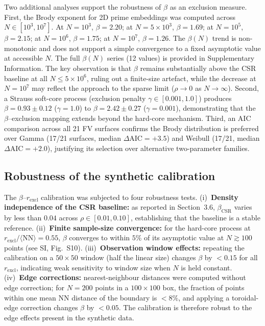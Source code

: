 \documentclass[final,3p,times,twocolumn]{elsarticle}
\theoremstyle{definition}
\begin{document}
Two additional analyses support the robustness of $\beta$
as an exclusion measure. First, the Brody exponent for 2D prime
embeddings was computed across $N \in [10^3, 10^7]$. At
$N=10^3$, $\beta=2.20$; at $N=5\times10^3$, $\beta=1.69$;
at $N=10^5$, $\beta=2.15$; at $N=10^6$, $\beta=1.75$;
at $N=10^7$, $\beta=1.26$. The $\beta(N)$ trend is
non-monotonic and does not support a simple convergence to a
fixed asymptotic value at accessible $N$. The full $\beta(N)$
series (12 values) is provided in Supplementary Information.
The key observation is that $\beta$ remains substantially above
the CSR baseline at all $N \leq 5\times10^6$, ruling out a
finite-size artefact, while the decrease at $N=10^7$ may
reflect the approach to the sparse limit ($\rho \to 0$ as
$N\to\infty$). Second, a Strauss soft-core
process (exclusion penalty $\gamma \in [0.001, 1.0]$)
produces $\beta = 0.93 \pm 0.12$ ($\gamma=1.0$) to
$\beta = 2.42 \pm 0.27$ ($\gamma=0.001$), demonstrating that
the $\beta$--exclusion mapping extends beyond the hard-core
mechanism. Third, an AIC
comparison across all 21 FV surfaces confirms the Brody
distribution is preferred over Gamma (17/21 surfaces,
median $\Delta\text{AIC} = +3.5$) and Weibull (17/21,
median $\Delta\text{AIC} = +2.0$), justifying its selection
over alternative two-parameter families.

\subsection{Robustness of the synthetic calibration}

The $\beta$--$r_{\text{excl}}$ calibration was subjected to four
robustness tests. (i)~\textbf{Density independence of the CSR
baseline:} as reported in Section~3.6, $\beta_{\text{CSR}}$ varies
by less than $0.04$ across $\rho \in [0.01, 0.10]$, establishing
that the baseline is a stable reference. (ii)~\textbf{Finite
sample-size convergence:} for the hard-core process at
$r_{\text{excl}}/\langle\text{NN}\rangle = 0.55$, $\beta$ converges
to within $5\%$ of its asymptotic value at $N \gtrsim 100$ points
(see SI, Fig.~S10). (iii)~\textbf{Observation window effects:}
repeating the calibration on a $50\times50$ window (half the linear
size) changes $\beta$ by $< 0.15$ for all $r_{\text{excl}}$, indicating
weak sensitivity to window size when $N$ is held constant.
(iv)~\textbf{Edge corrections:} nearest-neighbour distances were
computed without edge correction; for $N=200$ points in a
$100\times100$ box, the fraction of points within one mean NN
distance of the boundary is $< 8\%$, and applying a
toroidal-edge correction changes $\beta$ by $< 0.05$. The
calibration is therefore robust to the edge effects present in
the synthetic data.
\end{document}
